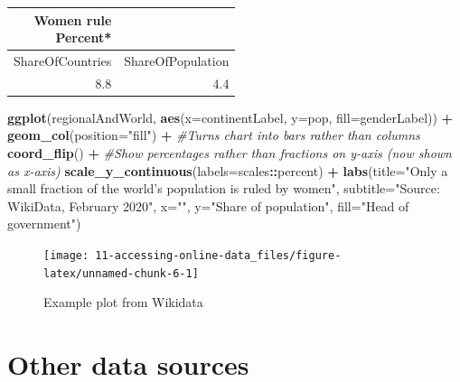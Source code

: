 \documentclass[
]{book}
\newenvironment{Shaded}{\begin{snugshade}}{\end{snugshade}}
\newcommand{\CommentTok}[1]{\textcolor[rgb]{0.56,0.35,0.01}{\textit{#1}}}
\newcommand{\DataTypeTok}[1]{\textcolor[rgb]{0.13,0.29,0.53}{#1}}
\newcommand{\KeywordTok}[1]{\textcolor[rgb]{0.13,0.29,0.53}{\textbf{#1}}}
\newcommand{\NormalTok}[1]{#1}
\newcommand{\OperatorTok}[1]{\textcolor[rgb]{0.81,0.36,0.00}{\textbf{#1}}}
\newcommand{\StringTok}[1]{\textcolor[rgb]{0.31,0.60,0.02}{#1}}
\begin{document}
\captionsetup[table]{labelformat=empty,skip=1pt}
\begin{longtable}{rr}
\caption*{
\large \textbf{Women rule}\\ 
\small *Percent*\\ 
} \\ 
\toprule
ShareOfCountries & ShareOfPopulation \\ 
\midrule
8.8 & 4.4 \\ 
\bottomrule
\end{longtable}

\begin{Shaded}
\begin{Highlighting}[]
\KeywordTok{ggplot}\NormalTok{(regionalAndWorld, }\KeywordTok{aes}\NormalTok{(}\DataTypeTok{x=}\NormalTok{continentLabel, }\DataTypeTok{y=}\NormalTok{pop, }\DataTypeTok{fill=}\NormalTok{genderLabel)) }\OperatorTok{+}\StringTok{ }\KeywordTok{geom_col}\NormalTok{(}\DataTypeTok{position=}\StringTok{"fill"}\NormalTok{) }\OperatorTok{+}\StringTok{ }
\StringTok{    }\CommentTok{#Turns chart into bars rather than columns}
\StringTok{    }\KeywordTok{coord_flip}\NormalTok{() }\OperatorTok{+}
\StringTok{    }\CommentTok{#Show percentages rather than fractions on y-axis (now shown as x-axis)}
\StringTok{    }\KeywordTok{scale_y_continuous}\NormalTok{(}\DataTypeTok{labels=}\NormalTok{scales}\OperatorTok{::}\NormalTok{percent) }\OperatorTok{+}
\StringTok{    }\KeywordTok{labs}\NormalTok{(}\DataTypeTok{title=}\StringTok{"Only a small fraction of the world's population is ruled by women"}\NormalTok{, }\DataTypeTok{subtitle=}\StringTok{"Source: WikiData, February 2020"}\NormalTok{, }\DataTypeTok{x=}\StringTok{""}\NormalTok{, }\DataTypeTok{y=}\StringTok{"Share of population"}\NormalTok{, }\DataTypeTok{fill=}\StringTok{"Head of government"}\NormalTok{)}
\end{Highlighting}
\end{Shaded}

\begin{figure}

{\centering \texttt{[image: 11-accessing-online-data\_files/figure-latex/unnamed-chunk-6-1]} 

}

\caption{Example plot from Wikidata}\label{fig:unnamed-chunk-6}
\end{figure}

\hypertarget{other-data-sources}{%
\section{Other data sources}\label{other-data-sources}}
\end{document}
